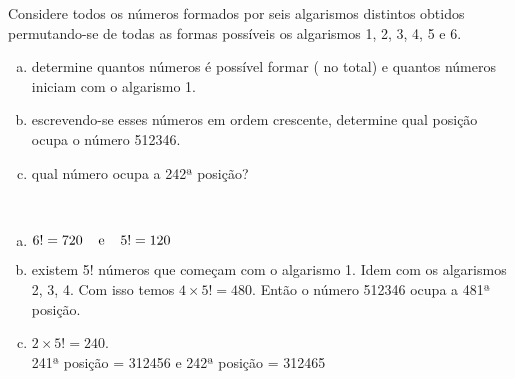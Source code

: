 \begin{ex}
    Considere todos os números formados por seis algarismos distintos obtidos permutando-se de todas as formas possíveis os algarismos 1, 2, 3, 4, 5 e 6. 
   \begin{enumerate}[(a)]
   \item determine quantos números é possível formar ( no total) e quantos números iniciam com o algarismo 1.
   \item escrevendo-se esses números em ordem crescente, determine qual posição ocupa o número 512346.
   \item qual número ocupa a 242ª posição?
   \end{enumerate}
     \begin{sol}
      \phantom{A} \\
        \begin{enumerate} [(a)]
            \item $6!= 720\hspace{0,4cm} \text{e} \hspace{0,4cm} 5!=120$
            \item existem 5! números que começam com o algarismo 1. Idem com os algarismos 2, 3, 4. Com isso temos $4\times5!=480$. Então o número 512346 ocupa a 481ª posição.
            \item $2\times5!= 240$.\\
            241ª posição = 312456 e 242ª posição = 312465
            
        \end{enumerate}
     \end{sol}
\end{ex}
